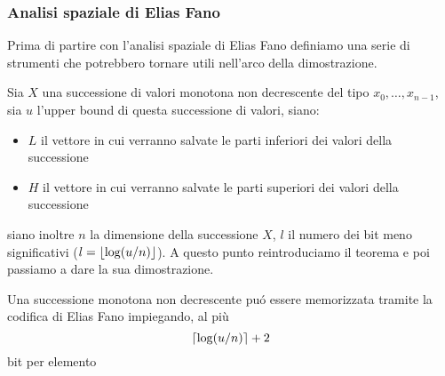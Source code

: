 \subsubsection{Analisi spaziale di Elias Fano}
Prima di partire con l'analisi spaziale di Elias Fano definiamo una serie di strumenti che potrebbero tornare utili nell'arco della dimostrazione.

Sia $X$ una successione di valori monotona non decrescente del tipo $x_0, \dots, x_{n - 1}$, sia $u$ l'upper bound di questa successione di valori, siano:
\begin{itemize}
    \item $L$ il vettore in cui verranno salvate le parti inferiori dei valori della successione
    \item $H$ il vettore in cui verranno salvate le parti superiori dei valori della successione
\end{itemize}
siano inoltre $n$ la dimensione della successione $X$, $l$ il numero dei bit meno significativi ($l = \left\lfloor \log(u/n) \right\rfloor$). A questo punto reintroduciamo il teorema e poi passiamo a dare la sua dimostrazione.
\begin{teo}
    Una successione monotona non decrescente puó essere memorizzata tramite la codifica di Elias Fano impiegando, al più
    \begin{equation}
        \left\lceil \log(u/n) \right\rceil + 2
    \end{equation}
    bit per elemento
\end{teo}
